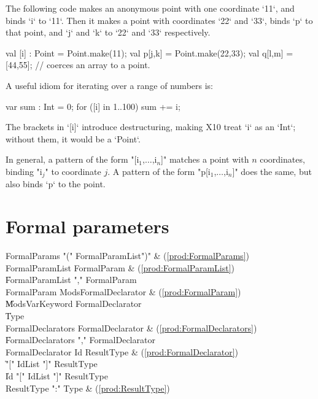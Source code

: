 The following code makes an anonymous point with one coordinate \xcd`11`, and
binds \xcd`i` to \xcd`11`.  Then it makes a point with coordinates \xcd`22`
and \xcd`33`, binds \xcd`p` to that point, and \xcd`j` and \xcd`k` to \xcd`22`
and \xcd`33` respectively.
\begin{xten}
val [i] : Point = Point.make(11);
val p[j,k] = Point.make(22,33);
val q[l,m] = [44,55]; // coerces an array to a point.
\end{xten}

A useful idiom for iterating over a range of numbers is: 
\begin{xten}
var sum : Int = 0;
for ([i] in 1..100) sum += i;
\end{xten}
\noindent
The brackets in \xcd`[i]` introduce destructuring, making X10 treat \xcd`i`
as an \xcd`Int`; without them, it would be a \xcd`Point`.  

In general, a pattern of the form \xcdmath"[i$_1$,$\ldots$,i$_n$]" matches a
point with {$n$} coordinates, binding \xcdmath"i$_j$" to coordinate {$j$}.  
A pattern of the form \xcdmath"p[i$_1$,$\ldots$,i$_n$]" does the same,  but
also binds \xcd`p` to the point.

\section{Formal parameters}

\begin{bbgrammar}
 FormalParams    \: \xcd"(" FormalParamList\opt \xcd")" & (\ref{prod:FormalParams})\\%
 FormalParamList    \: FormalParam & (\ref{prod:FormalParamList})\\%
    \| FormalParamList \xcd"," FormalParam\\
 FormalParam    \: Mods\opt FormalDeclarator & (\ref{prod:FormalParam})\\%
    \| Mods\opt VarKeyword FormalDeclarator\\
    \| Type\\
 FormalDeclarators    \: FormalDeclarator & (\ref{prod:FormalDeclarators})\\%
    \| FormalDeclarators \xcd"," FormalDeclarator\\
 FormalDeclarator    \: Id ResultType & (\ref{prod:FormalDeclarator})\\%
    \| \xcd"[" IdList \xcd"]" ResultType\\
    \| Id \xcd"[" IdList \xcd"]" ResultType\\
 ResultType    \: \xcd":" Type & (\ref{prod:ResultType})\\%
\end{bbgrammar}

